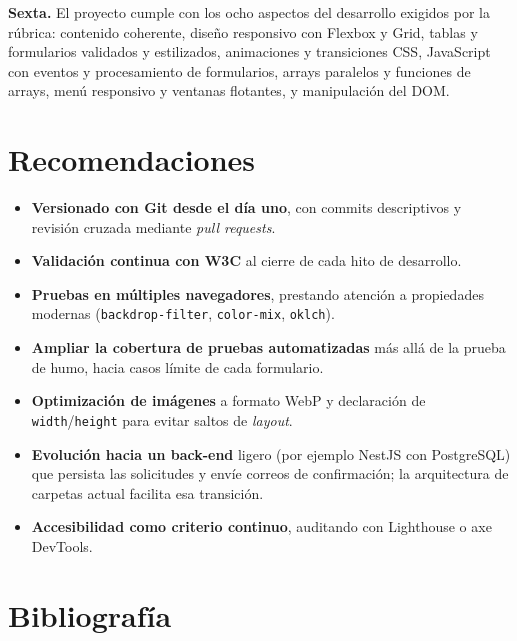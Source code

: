 \documentclass[11pt,a4paper]{article}
\begin{document}
\textbf{Sexta.} El proyecto cumple con los ocho aspectos del desarrollo exigidos por la rúbrica: contenido coherente, diseño responsivo con Flexbox y Grid, tablas y formularios validados y estilizados, animaciones y transiciones CSS, JavaScript con eventos y procesamiento de formularios, arrays paralelos y funciones de arrays, menú responsivo y ventanas flotantes, y manipulación del DOM.

\section{Recomendaciones}

\begin{itemize}
  \item \textbf{Versionado con Git desde el día uno}, con commits descriptivos y revisión cruzada mediante \emph{pull requests}.
  \item \textbf{Validación continua con W3C} al cierre de cada hito de desarrollo.
  \item \textbf{Pruebas en múltiples navegadores}, prestando atención a propiedades modernas (\lstinline|backdrop-filter|, \lstinline|color-mix|, \lstinline|oklch|).
  \item \textbf{Ampliar la cobertura de pruebas automatizadas} más allá de la prueba de humo, hacia casos límite de cada formulario.
  \item \textbf{Optimización de imágenes} a formato WebP y declaración de \lstinline|width|/\lstinline|height| para evitar saltos de \emph{layout}.
  \item \textbf{Evolución hacia un back-end} ligero (por ejemplo NestJS con PostgreSQL) que persista las solicitudes y envíe correos de confirmación; la arquitectura de carpetas actual facilita esa transición.
  \item \textbf{Accesibilidad como criterio continuo}, auditando con Lighthouse o axe DevTools.
\end{itemize}

\section{Bibliografía}
\end{document}

